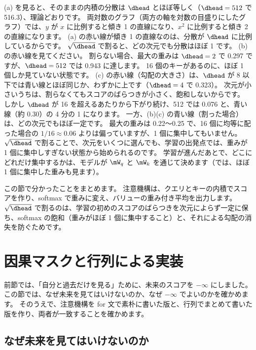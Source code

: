 (a) を見ると、そのままの内積の分散は $\dhead$ とほぼ等しく（$\dhead=512$ で 516.3）、理論どおりです。
両対数のグラフ（両方の軸を対数の目盛りにしたグラフ）では、$y$ が $x$ に比例すると傾き 1 の直線になり、$x^2$ に比例すると傾き 2 の直線になります。
(a) の赤い線が傾き 1 の直線なのは、分散が $\dhead$ に比例しているからです。
$\sqrt{\dhead}$ で割ると、どの次元でも分散はほぼ 1 です。
(b) の赤い線を見てください。
割らない場合、最大の重みは $\dhead=2$ で 0.297 ですが、$\dhead=512$ では 0.943 に達します。
16 個のキーがあるのに、ほぼ 1 個しか見ていない状態です。
(c) の赤い線（勾配の大きさ）は、$\dhead$ が 8 以下では青い線とほぼ同じか、わずかに上です（$\dhead=4$ で 0.323）。
次元が小さいうちは、割らなくてもスコアのばらつきが小さく、飽和しないからです。
しかし $\dhead$ が 16 を超えるあたりから下がり続け、512 では 0.076 と、青い線（約 0.30）の 4 分の 1 になります。
一方、(b)(c) の青い線（割った場合）は、どの次元でもほぼ一定です。
最大の重みは 0.22〜0.25 で、16 個に均等に配った場合の $1/16\approx0.06$ よりは偏っていますが、1 個に集中してもいません。
$\sqrt{\dhead}$ で割ることで、次元をいくつに選んでも、学習の出発点では、重みが 1 個に集中しすぎない状態から始められるのです。
学習が進んだあとで、どこにどれだけ集中するかは、モデルが $\mW_q$ と $\mW_k$ を通じて決めます（では、ほぼ 1 個に集中した重みも見ます）。

この節で分かったことをまとめます。
注意機構は、クエリとキーの内積でスコアを作り、softmax で重みに変え、バリューの重み付き平均を出力します。
$\sqrt{\dhead}$ で割るのは、学習の初めのスコアのばらつきを次元によらず一定に保ち、softmax の飽和（重みがほぼ 1 個に集中すること）と、それによる勾配の消失を防ぐためです。

\section{因果マスクと行列による実装}\label{sec:attn-causal}

前節では、「自分と過去だけを見る」ために、未来のスコアを $-\infty$ にしました。
この節では、なぜ未来を見てはいけないのか、なぜ $-\infty$ でよいのかを確かめます。
そのうえで、注意機構を for 文で素朴に書いた版と、行列でまとめて書いた版を作り、両者が一致することを確かめます。

\subsection*{なぜ未来を見てはいけないのか}

